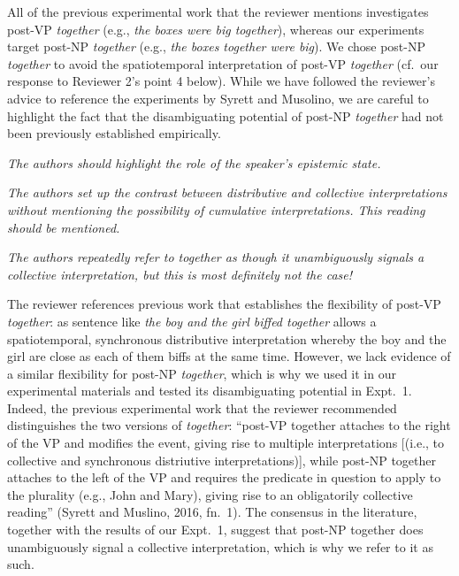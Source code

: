 \documentclass[12pt]{article}
\begin{document}
All of the previous experimental work that the reviewer mentions investigates post-VP \emph{together} (e.g., \emph{the boxes were big together}), whereas our experiments target post-NP \emph{together} (e.g., \emph{the boxes together were big}). We chose post-NP \emph{together} to avoid the spatiotemporal interpretation of post-VP \emph{together} (cf.~our response to Reviewer 2's point 4 below). While we have followed the reviewer's advice to reference the experiments by Syrett and Musolino, we are careful to highlight the fact that the disambiguating potential of post-NP \emph{together} had not been previously established empirically.

\item \emph{The authors should highlight the role of the speaker's epistemic state.}

\item \emph{The authors set up the contrast between distributive and collective interpretations without mentioning the possibility of cumulative interpretations. This reading should be mentioned.}

\item \emph{The authors repeatedly refer to \emph{together} as though it unambiguously signals a collective interpretation, but this is most definitely not the case!}

The reviewer references previous work that establishes the flexibility of post-VP \emph{together}: as sentence like \emph{the boy and the girl biffed together} allows a spatiotemporal, synchronous distributive interpretation whereby the boy and the girl are close as each of them biffs at the same time. However, we lack evidence of a similar flexibility for post-NP \emph{together}, which is why we used it in our experimental materials and tested its disambiguating potential in Expt.~1. Indeed, the previous experimental work that the reviewer recommended distinguishes the two versions of \emph{together}: 
``post-VP together attaches to the right of the VP and modifies the event, giving rise to multiple interpretations [(i.e., to collective and synchronous distriutive interpretations)], while post-NP together attaches to the left of the VP and requires the predicate in question to apply to the plurality (e.g., John and Mary), giving rise to an obligatorily collective reading'' (Syrett and Muslino, 2016, fn.~1). The consensus in the literature, together with the results of our Expt.~1, suggest that post-NP together does unambiguously signal a collective interpretation, which is why we refer to it as such.
\end{document}
